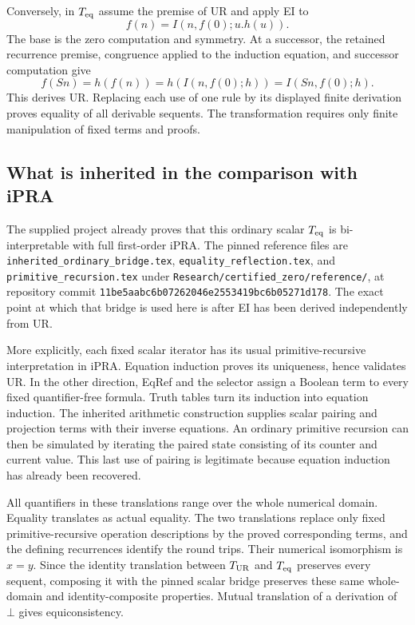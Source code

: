 \documentclass[11pt]{article}
\newcommand{\file}[1]{\nolinkurl{#1}}
\begin{document}
Conversely, in $T_{\rm eq}$ assume the premise of UR and apply EI to
\[
                       f(n)=I(n,f(0);u.h(u)).
\]
The base is the zero computation and symmetry.  At a successor, the
retained recurrence premise, congruence applied to the induction
equation, and successor computation give
\[
 f(Sn)=h(f(n))=h(I(n,f(0);h))=I(Sn,f(0);h).
\]
This derives UR.  Replacing each use of one rule by its displayed finite
derivation proves equality of all derivable sequents.  The transformation
requires only finite manipulation of fixed terms and proofs.

\subsection{What is inherited in the comparison with iPRA}
The supplied project already proves that this ordinary scalar
$T_{\rm eq}$ is bi-interpretable with full first-order iPRA.  The pinned
reference files are \file{inherited_ordinary_bridge.tex},
\file{equality_reflection.tex}, and
\file{primitive_recursion.tex} under
\file{Research/certified_zero/reference/}, at repository commit
\texttt{11be5aabc6b07262046e2553419bc6b05271d178}.
The exact point at which that bridge is used here is after EI has been
derived independently from UR.

More explicitly, each fixed scalar iterator has its usual
primitive-recursive interpretation in iPRA.  Equation induction proves
its uniqueness, hence validates UR.  In the other direction, EqRef
and the selector assign a Boolean term to every fixed quantifier-free
formula.  Truth tables turn its induction into equation induction.
The inherited arithmetic construction supplies scalar pairing and
projection terms with their inverse equations.  An ordinary primitive
recursion can then be simulated by iterating the paired state consisting
of its counter and current value.  This last use of pairing is legitimate
because equation induction has already been recovered.

All quantifiers in these translations range over the whole numerical
domain.  Equality translates as actual equality.  The two translations
replace only fixed primitive-recursive operation descriptions by the
proved corresponding terms, and the defining recurrences identify the
round trips.  Their numerical isomorphism is $x=y$.  Since the identity
translation between $T_{\rm UR}$ and $T_{\rm eq}$ preserves every sequent,
composing it with the pinned scalar bridge preserves these same whole-
domain and identity-composite properties.  Mutual translation of a
derivation of $\bot$ gives equiconsistency.
\end{document}

